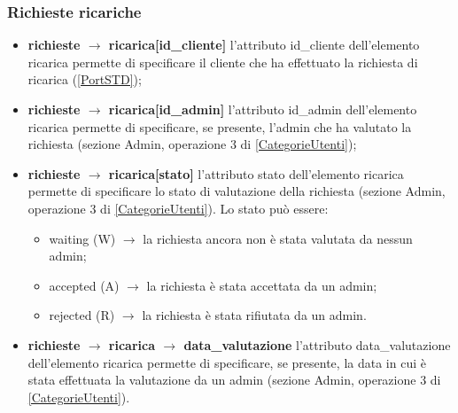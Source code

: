 \documentclass[a4paper, 14pt]{article}
\begin{document}
\begin{flushleft}
			\subsubsection{Richieste ricariche} 
			\begin{itemize}
				\item \textbf{richieste $\rightarrow$ ricarica[id\_cliente] } l'attributo id\_cliente dell'elemento ricarica permette di specificare il cliente che ha effettuato la richiesta di ricarica (\ref{PortSTD});
				\item \textbf{richieste $\rightarrow$ ricarica[id\_admin] } l'attributo id\_admin dell'elemento ricarica permette di specificare, se presente, l'admin che ha valutato la richiesta (sezione Admin, operazione 3 di \ref{CategorieUtenti});
				\item \textbf{richieste $\rightarrow$ ricarica[stato] } l'attributo stato dell'elemento ricarica permette di specificare lo stato di valutazione della richiesta 
				(sezione Admin, operazione 3 di \ref{CategorieUtenti}). Lo stato può essere:
				\begin{itemize}
					\item waiting (W) $\rightarrow$ la richiesta ancora non è stata valutata da nessun admin;
					\item accepted (A) $\rightarrow$ la richiesta è stata accettata da un admin;
					\item rejected (R) $\rightarrow$ la richiesta è stata rifiutata da un admin.
				\end{itemize}
				\item \textbf{richieste $\rightarrow$ ricarica $\rightarrow$ data\_valutazione } l'attributo data\_valutazione dell'elemento ricarica permette di specificare, se presente, la data in cui è stata effettuata la valutazione da un admin (sezione Admin, operazione 3 di \ref{CategorieUtenti}).
			\end{itemize}

	\end{flushleft}
\end{document}

